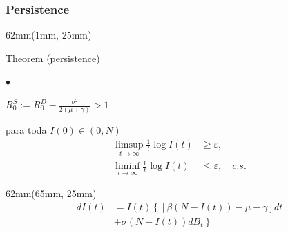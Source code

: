 \begin{frame}
    \frametitle{Persistence}
        \begin{textblock*}{62mm}(1mm, 25mm)
            \begin{yellowbox}{Theorem (persistence)}
                \begin{list}{$\bullet$}{}
                    \item
                        $
                            \displaystyle
                            R_0 ^ S := R_0 ^D
                            - \frac{\sigma ^ 2}{2(\mu + \gamma)} > 1
                        $
                \end{list}
                 \tcblower
                 para toda $I(0)\in (0, N)$
                \begin{align*}
                    \limsup_{t \to \infty} 
                        \frac{1}{t} \log I(t)
                        &
                        \geq
                        \varepsilon,
                    \\
                    \liminf_{t \to \infty}
                        \frac{1}{t} \log I(t)
                        &
                        \leq
                        \varepsilon,  \quad c.s.
                \end{align*}
            \end{yellowbox}
        \end{textblock*}
         \begin{textblock*}{62mm}(65mm, 25mm)
            \begin{align*}
                dI(t) &= 
                    I(t)
                    \left\{
                        [
                            \beta (N - I(t))
                            -\mu - \gamma
                        ]
                        dt
                    \right.
                    \\
                     &+
                    \left.
                        \sigma (N-I(t))
                        dB_t
                    \right\}
                    \tag{$\star$}
            \end{align*}

\end{textblock*}
\end{frame}
